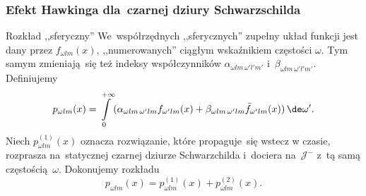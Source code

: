 \documentclass{beamer}  %
\begin{document}
\begin{frame}
  \frametitle{Efekt Hawkinga dla~czarnej dziury Schwarzschilda}

  \begin{block}{Rozkład ,,sferyczny''}
    We~współrzędnych ,,sferycznych'' zupełny układ funkcji jest dany
    przez $f_{ \omega l m }( x )$, ,,numerowanych'' ciągłym
    wskaźnikiem częstości $\omega$. Tym samym zmieniają~się też
    indeksy współczynników $\alpha_{ \omega l m\, \omega' l' m' }$
    i~$\beta_{ \omega l m\, \omega' l' m' }$. Definiujemy
    \begin{equation}
      \label{eq:HawkingPromieniowanie-24}
      p_{ \omega l m }( x )
      = \int\limits_{ 0 }^{ +\infty } ( \alpha_{ \omega l m\, \omega' l m }
      f_{ \omega' l m }( x ) + \beta_{ \omega l m\, \omega' l m }
      \bar{ f }_{ \omega' l m }( x ) )\, \de \omega'.
    \end{equation}
    Niech $p_{ \omega l m }^{ ( 1 ) }( x )$ oznacza rozwiązanie, które
    propaguje~się wstecz w czasie, rozprasza na~statycznej czarnej
    dziurze Schwarzchilda i~dociera na~$\mathcal{J}^{ - }$ z~tą samą
    częstością~$\omega$. Dokonujemy rozkładu
    \begin{equation}
      \label{eq:HawkingPromieniowanie-25}
      p_{ \omega l m }( x ) = p_{ \omega l m }^{ ( 1 ) }( x ) + p_{
        \omega l m }^{ ( 2 ) }( x ).
    \end{equation}
  \end{block}

\end{frame}
\end{document}

